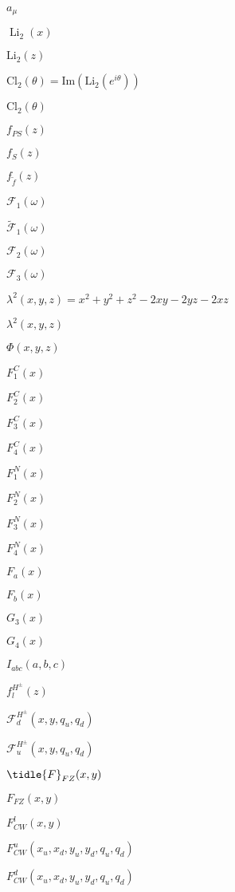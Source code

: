 \documentclass{article}
\begin{document}
$a_\mu$
\pagebreak

$\operatorname{Li}_2(x)$
\pagebreak

$\mathrm{Li}_2(z)$
\pagebreak

$\mathrm{Cl}_2(\theta) = \mathrm{Im}(\mathrm{Li}_2(e^{i\theta}))$
\pagebreak

$\mathrm{Cl}_2(\theta)$
\pagebreak

$f_{PS}(z)$
\pagebreak

$f_S(z)$
\pagebreak

$f_{\tilde{f}}(z)$
\pagebreak

$\mathcal{F}_1(\omega)$
\pagebreak

$\tilde{\mathcal{F}}_1(\omega)$
\pagebreak

$\mathcal{F}_2(\omega)$
\pagebreak

$\mathcal{F}_3(\omega)$
\pagebreak

$\lambda^2(x,y,z) = x^2 + y^2 + z^2 - 2xy - 2yz - 2xz$
\pagebreak

$\lambda^2(x,y,z)$
\pagebreak

$\Phi(x,y,z)$
\pagebreak

$F_1^C(x)$
\pagebreak

$F_2^C(x)$
\pagebreak

$F_3^C(x)$
\pagebreak

$F_4^C(x)$
\pagebreak

$F_1^N(x)$
\pagebreak

$F_2^N(x)$
\pagebreak

$F_3^N(x)$
\pagebreak

$F_4^N(x)$
\pagebreak

$F_a(x)$
\pagebreak

$F_b(x)$
\pagebreak

$G_3(x)$
\pagebreak

$G_4(x)$
\pagebreak

$I_{abc}(a,b,c)$
\pagebreak

$f_l^{H^\pm}(z)$
\pagebreak

$\mathcal{F}_d^{H^\pm}(x,y,q_u,q_d)$
\pagebreak

$\mathcal{F}_u^{H^\pm}(x,y,q_u,q_d)$
\pagebreak

$\tidle{F}_{FZ}(x,y)$
\pagebreak

$F_{FZ}(x,y)$
\pagebreak

$F_{CW}^l(x,y)$
\pagebreak

$F_{CW}^u(x_u,x_d,y_u,y_d,q_u,q_d)$
\pagebreak

$F_{CW}^d(x_u,x_d,y_u,y_d,q_u,q_d)$
\pagebreak
\end{document}
